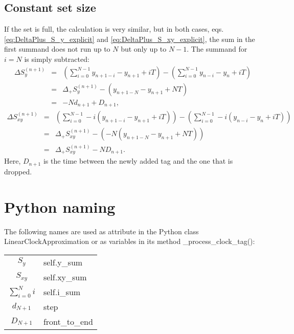 \documentclass[]{scrreprt}
\begin{document}
\section{Constant set size}
If the set is full, the calculation is very similar, but in both cases, eqs. \ref{eq:DeltaPlus_S_y_explicit} and \ref{eq:DeltaPlus_S_xy_explicit}, the sum in the first summand does not run up to $N$ but only up to $N-1$. The summand for $i=N$ is simply subtracted:
\begin{eqnarray}
    \Delta S_y^{(n+1)} &=& \left(\sum_{i=0}^{N-1} y_{n + 1 - i} - y_{n+1} + i T\right) - \left(\sum_{i=0}^{N-1} y_{n - i} - y_n + i T\right) \nonumber \\
    &=& \Delta_+ S_y^{(n+1)} - \left(y_{n+1-N} - y_{n+1} + NT\right) \nonumber \\
    &=& - N d_{n+1} + D_{n+1},
\end{eqnarray}
\begin{eqnarray}
    \Delta S_{xy}^{(n+1)} &=& \left(\sum_{i=0}^{N-1} -i \left(y_{n+1-i} - y_{n+1} + i T\right)\right) - \left(\sum_{i=0}^{N-1} -i \left(y_{n - i} - y_n + i T\right)\right) \nonumber \\
    &=& \Delta_+ S_{xy}^{(n+1)} - \left(-N\left(y_{n+1-N} - y_{n+1} + NT\right)\right) \nonumber \\
    &=& \Delta_+ S_{xy}^{(n+1)} - N D_{n+1}.
\end{eqnarray}
Here, $D_{n+1}$ is the time between the newly added tag and the one that is dropped.

\chapter{Python naming}
The following names are used as attribute in the Python class {\ttfamily LinearClockApproximation} or as variables in its method {\ttfamily\_process\_clock\_tag()}:
\begin{table}[h]
    \centering
    \begin{tabular}{|c|l|}
        \hline
        $S_y$ & {\ttfamily self.y\_sum} \\
        $S_{xy}$ & {\ttfamily self.xy\_sum} \\
        $\sum_{i=0}^N i$ & {\ttfamily self.i\_sum} \\
        $d_{N+1}$ & {\ttfamily step} \\
        $D_{N+1}$ & {\ttfamily front\_to\_end} \\
        \hline
    \end{tabular}
\end{table}
\end{document}
